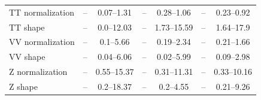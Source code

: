 \begin{table}[H]
\begin{center}
\begin{footnotesize}
\begin{tabular}{lcccccc}
				TT normalization & -- & 0.07--1.31 & -- & 0.28--1.06 & -- & 0.23--0.92 \\
				TT shape & -- & 0.0--12.03 & -- & 1.73--15.59 & -- & 1.64--17.9 \\
				VV normalization & -- & 0.1--5.66 & -- & 0.19--2.34 & -- & 0.21--1.66 \\
				VV shape & -- & 0.04--6.06 & -- & 0.02--5.99 & -- & 0.09--2.98 \\
				Z normalization & -- & 0.55--15.37 & -- & 0.31--11.31 & -- & 0.33--10.16 \\
				Z shape & -- & 0.2--18.37 & -- & 0.2--4.55 & -- & 0.21--9.26 \\ \hline \hline
			\end{tabular}
			\label{tab:SysRangesAll}
        \end{footnotesize}
	\end{center}
\end{table}

